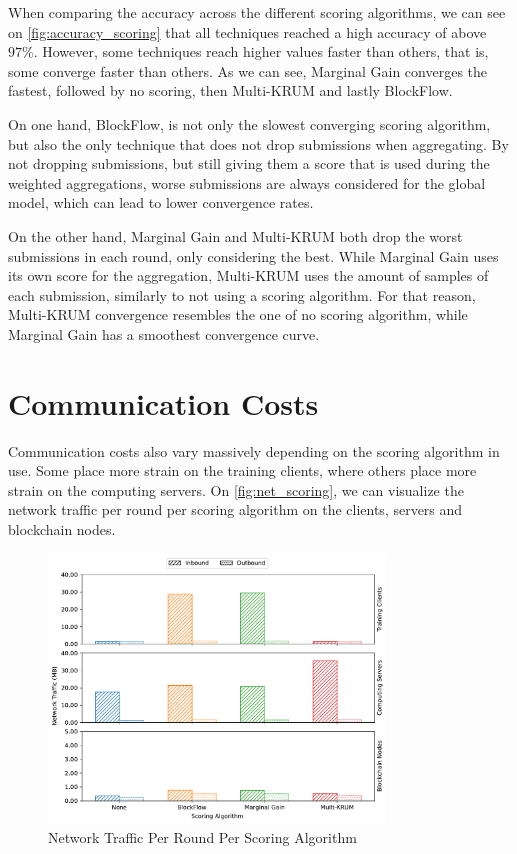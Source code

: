 When comparing the accuracy across the different scoring algorithms, we can see on \autoref{fig:accuracy_scoring} that all techniques reached a high accuracy of above $97\%$. However, some techniques reach higher values faster than others, that is, some converge faster than others. As we can see, Marginal Gain converges the fastest, followed by no scoring, then Multi-KRUM and lastly BlockFlow.

On one hand, BlockFlow, is not only the slowest converging scoring algorithm, but also the only technique that does not drop submissions when aggregating. By not dropping submissions, but still giving them a score that is used during the weighted aggregations, worse submissions are always considered for the global model, which can lead to lower convergence rates. 

On the other hand, Marginal Gain and Multi-KRUM both drop the worst submissions in each round, only considering the best. While Marginal Gain uses its own score for the aggregation, Multi-KRUM uses the amount of samples of each submission, similarly to not using a scoring algorithm. For that reason, Multi-KRUM convergence resembles the one of no scoring algorithm, while Marginal Gain has a smoothest convergence curve.

\section{Communication Costs}

Communication costs also vary massively depending on the scoring algorithm in use. Some place more strain on the training clients, where others place more strain on the computing servers. On \autoref{fig:net_scoring}, we can visualize the network traffic per round per scoring algorithm on the clients, servers and blockchain nodes.

\begin{figure}[!ht]
    \centering
    \centering
    \includegraphics[width=0.8\textwidth]{graphics/scoring/net.pdf}
    \caption{Network Traffic Per Round Per Scoring Algorithm}
    \label{fig:net_scoring}
\end{figure}

